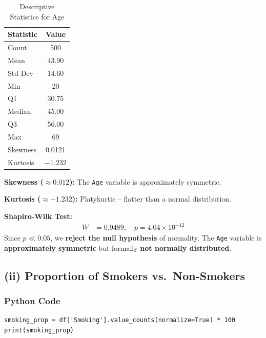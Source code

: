 \documentclass[12pt,a4paper]{article}
\begin{document}
\begin{table}[H]
  \centering
  \caption{Descriptive Statistics for Age}
  \begin{tabular}{lc}
    \toprule
    \textbf{Statistic} & \textbf{Value} \\
    \midrule
    Count    & 500 \\
    Mean     & 43.90 \\
    Std Dev  & 14.60 \\
    Min      & 20 \\
    Q1       & 30.75 \\
    Median   & 45.00 \\
    Q3       & 56.00 \\
    Max      & 69 \\
    Skewness & 0.0121 \\
    Kurtosis & $-1.232$ \\
    \bottomrule
  \end{tabular}
\end{table}

\noindent\textbf{Skewness ($\approx 0.012$):} The \texttt{Age} variable is approximately symmetric.

\noindent\textbf{Kurtosis ($\approx -1.232$):} Platykurtic -- flatter than a normal distribution.

\noindent\textbf{Shapiro-Wilk Test:}
\begin{align*}
  W &= 0.9489, \quad p = 4.04 \times 10^{-12}
\end{align*}
Since $p \ll 0.05$, we \textbf{reject the null hypothesis} of normality. The \texttt{Age} variable is \textbf{approximately symmetric} but formally \textbf{not normally distributed}.

\subsection{(ii) Proportion of Smokers vs.\ Non-Smokers}

\subsubsection{Python Code}

\begin{lstlisting}[style=pythonstyle, caption={Smoking proportions}]
smoking_prop = df['Smoking'].value_counts(normalize=True) * 100
print(smoking_prop)
\end{lstlisting}
\end{document}
